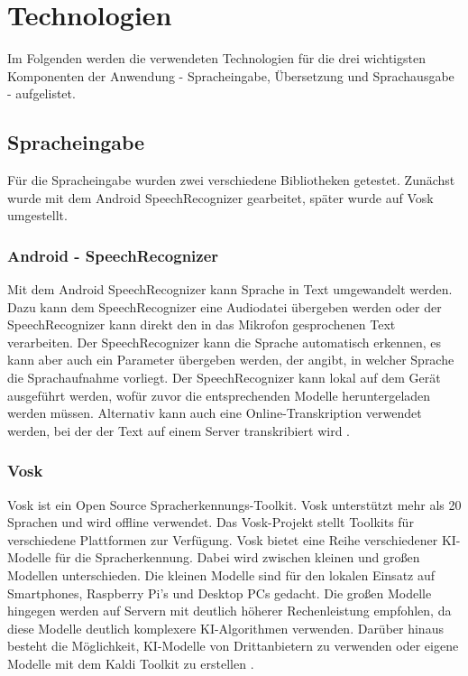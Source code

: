 \newpage
\section{Technologien}\label{sec:stateOfTheArt}
Im Folgenden werden die verwendeten Technologien für die drei wichtigsten Komponenten der Anwendung - Spracheingabe, Übersetzung und Sprachausgabe - aufgelistet.

\subsection{Spracheingabe}
Für die Spracheingabe wurden zwei verschiedene Bibliotheken getestet. Zunächst wurde mit dem Android SpeechRecognizer gearbeitet, später wurde auf Vosk umgestellt.

\subsubsection{Android - SpeechRecognizer}
Mit dem Android SpeechRecognizer kann Sprache in Text umgewandelt werden. Dazu kann dem SpeechRecognizer eine Audiodatei übergeben werden oder der SpeechRecognizer kann direkt den in das Mikrofon gesprochenen Text verarbeiten. Der SpeechRecognizer kann die Sprache automatisch erkennen, es kann aber auch ein Parameter übergeben werden, der angibt, in welcher Sprache die Sprachaufnahme vorliegt. Der SpeechRecognizer kann lokal auf dem Gerät ausgeführt werden, wofür zuvor die entsprechenden Modelle heruntergeladen werden müssen. Alternativ kann auch eine Online-Transkription verwendet werden, bei der der Text auf einem Server transkribiert wird \cite{androidSpeechRecognizer}.

\subsubsection{Vosk}
Vosk ist ein Open Source Spracherkennungs-Toolkit. Vosk unterstützt mehr als 20 Sprachen und wird offline verwendet. Das Vosk-Projekt stellt Toolkits für verschiedene Plattformen zur Verfügung. Vosk bietet eine Reihe verschiedener KI-Modelle für die Spracherkennung. Dabei wird zwischen kleinen und großen Modellen unterschieden. Die kleinen Modelle sind für den lokalen Einsatz auf Smartphones, Raspberry Pi's und Desktop PCs gedacht. Die großen Modelle hingegen werden auf Servern mit deutlich höherer Rechenleistung empfohlen, da diese Modelle deutlich komplexere KI-Algorithmen verwenden. Darüber hinaus besteht die Möglichkeit, KI-Modelle von Drittanbietern zu verwenden oder eigene Modelle mit dem Kaldi Toolkit zu erstellen \cite{vosk}. 

